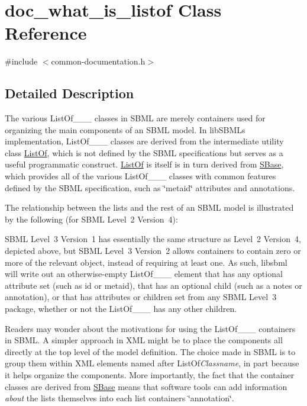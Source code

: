 \hypertarget{classdoc__what__is__listof}{}\section{doc\+\_\+what\+\_\+is\+\_\+listof Class Reference}
\label{classdoc__what__is__listof}


{\ttfamily \#include $<$common-\/documentation.\+h$>$}



\subsection{Detailed Description}
\begin{DoxyParagraph}{}
The various List\+Of\+\_\+\+\_\+\+\_\+ classes in S\+B\+ML are merely containers used for organizing the main components of an S\+B\+ML model. In lib\+S\+B\+ML\textquotesingle{}s implementation, List\+Of\+\_\+\+\_\+\+\_\+ classes are derived from the intermediate utility class \hyperlink{class_list_of}{List\+Of}, which is not defined by the S\+B\+ML specifications but serves as a useful programmatic construct. \hyperlink{class_list_of}{List\+Of} is itself is in turn derived from \hyperlink{class_s_base}{S\+Base}, which provides all of the various List\+Of\+\_\+\+\_\+\+\_\+ classes with common features defined by the S\+B\+ML specification, such as \char`\"{}metaid\char`\"{} attributes and annotations.
\end{DoxyParagraph}
The relationship between the lists and the rest of an S\+B\+ML model is illustrated by the following (for S\+B\+ML Level~2 Version~4)\+:



S\+B\+ML Level~3 Version~1 has essentially the same structure as Level~2 Version~4, depicted above, but S\+B\+ML Level~3 Version~2 allows containers to contain zero or more of the relevant object, instead of requiring at least one. As such, libsbml will write out an otherwise-\/empty List\+Of\+\_\+\+\_\+\+\_\+ element that has any optional attribute set (such as \textquotesingle{}id\textquotesingle{} or \textquotesingle{}metaid\textquotesingle{}), that has an optional child (such as a \textquotesingle{}notes\textquotesingle{} or \textquotesingle{}annotation\textquotesingle{}), or that has attributes or children set from any S\+B\+ML Level~3 package, whether or not the List\+Of\+\_\+\+\_\+\+\_\+ has any other children.

Readers may wonder about the motivations for using the List\+Of\+\_\+\+\_\+\+\_\+ containers in S\+B\+ML. A simpler approach in X\+ML might be to place the components all directly at the top level of the model definition. The choice made in S\+B\+ML is to group them within X\+ML elements named after List\+Of{\itshape Classname}, in part because it helps organize the components. More importantly, the fact that the container classes are derived from \hyperlink{class_s_base}{S\+Base} means that software tools can add information {\itshape about} the lists themselves into each list container\textquotesingle{}s \char`\"{}annotation\char`\"{}.

